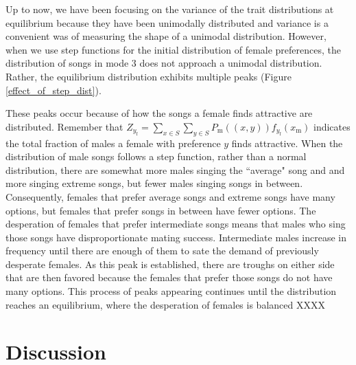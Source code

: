 \documentclass{article}
\newcommand{\x}[1]{\text{#1}}
\begin{document}
Up to now, we have been focusing on the variance of the trait distributions at equilibrium because they have been unimodally distributed and variance is a convenient was of measuring the shape of a unimodal distribution. However, when we use step functions for the initial distribution of female preferences, the distribution of songs in mode $3$ does not approach a unimodal distribution. Rather, the equilibrium distribution exhibits multiple peaks (Figure \ref{effect_of_step_dist}). 

These peaks occur because of how the songs a female finds attractive are distributed. Remember that $Z_{y_\x{f}}=\sum_{x\in S}\sum_{y\in S}P_\x{m}((x,y))f_{y_\x{f}}(x_\x{m})$ indicates the total fraction of males a female with preference $y$ finds attractive. When the distribution of male songs follows a step function, rather than a normal distribution, there are somewhat more males singing the ``average" song and and more singing extreme songs, but fewer males singing songs in between. %
Consequently, females that prefer average songs and extreme songs have many options, but females that prefer songs in between have fewer options. The desperation of females that prefer intermediate songs means that males who sing those songs have disproportionate mating success. Intermediate males increase in frequency until there are enough of them to sate the demand of previously desperate females. As this peak is established, there are troughs on either side that are then favored because the females that prefer those songs do not have many options. This process of peaks appearing continues until the distribution reaches an equilibrium, where the desperation of females is balanced XXXX

\section*{Discussion}

\end{document}

